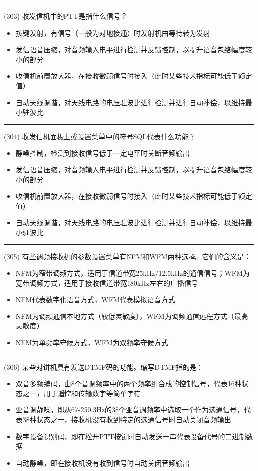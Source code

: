 \documentclass[twocolumn]{ctexart}  %
\begin{document}
\noindent\rule{0.5\textwidth}{1pt}
\heiti (303) 收发信机中的PTT是指什么信号？ \songti {\color{gray} [LK0258] }
\begin{itemize}
	\item  按键发射，有信号（一般为对地接通）时发射机由等待转为发射
	\item  发信语音压缩，对音频输入电平进行检测并反馈控制，以提升语音包络幅度较小的部分
	\item  收信机前置放大器，在接收微弱信号时接入（此时某些技术指标可能低于额定值）
	\item  自动天线调谐，对天线电路的电压驻波比进行检测并进行自动补偿，以维持最小驻波比
\end{itemize}


\noindent\rule{0.5\textwidth}{1pt}
\heiti (304) 收发信机面板上或设置菜单中的符号SQL代表什么功能？ \songti {\color{gray} [LK0259] }
\begin{itemize}
	\item  静噪控制，检测到接收信号低于一定电平时关断音频输出
	\item  发信语音压缩，对音频输入电平进行检测并反馈控制，以提升语音包络幅度较小的部分
	\item  收信机前置放大器，在接收微弱信号时接入（此时某些技术指标可能低于额定值）
	\item  自动天线调谐，对天线电路的电压驻波比进行检测并进行自动补偿，以维持最小驻波比
\end{itemize}


\noindent\rule{0.5\textwidth}{1pt}
\heiti (305) 有些调频接收机的参数设置菜单有NFM和WFM两种选择。它们的含义是： \songti {\color{gray} [LK0260] }
\begin{itemize}
	\item  NFM为窄带调频方式，适用于信道带宽25kHz/12.5kHz的通信信号；WFM为宽带调频方式，适用于接收信道带宽180kHz左右的广播信号
	\item  NFM代表数字化语音方式，WFM代表模拟语音方式
	\item  NFM为调频通信本地方式（较低灵敏度），WFM为调频通信远程方式（最高灵敏度）
	\item  NFM为单频率守候方式，WFM为双频率守候方式
\end{itemize}


\noindent\rule{0.5\textwidth}{1pt}
\heiti (306) 某些对讲机具有发送DTMF码的功能。缩写DTMF指的是： \songti {\color{gray} [LK0261] }
\begin{itemize}
	\item  双音多频编码，由8个音调频率中的两个频率组合成的控制信号，代表16种状态之一，用于遥控和传输数字等简单字符
	\item  亚音调静噪，即从67-250.3Hz的38个亚音调频率中选取一个作为选通信号，代表38种状态之一，接收机没有收到特定的选通信号时自动关闭音频输出
	\item  数字设备识别码，即在松开PTT按键时自动发送一串代表设备代号的二进制数据
	\item  自动静噪，即在接收机没有收到信号时自动关闭音频输出
\end{itemize}
\end{document}
